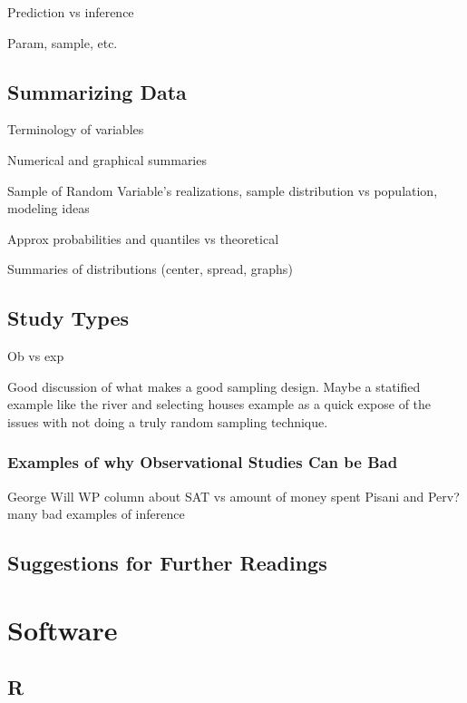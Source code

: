 \documentclass[
]{book}
\theoremstyle{definition}
\theoremstyle{definition}
\theoremstyle{definition}
\theoremstyle{remark}
\begin{document}
Prediction vs inference

Param, sample, etc.

\hypertarget{summarizing-data}{%
\subsection{Summarizing Data}\label{summarizing-data}}

Terminology of variables

Numerical and graphical summaries

Sample of Random Variable's realizations, sample distribution vs population, modeling ideas

Approx probabilities and quantiles vs theoretical

Summaries of distributions (center, spread, graphs)

\hypertarget{study-types}{%
\subsection{Study Types}\label{study-types}}

Ob vs exp

Good discussion of what makes a good sampling design. Maybe a statified example like the river and selecting houses example as a quick expose of the issues with not doing a truly random sampling technique.

\hypertarget{examples-of-why-observational-studies-can-be-bad}{%
\subsubsection{Examples of why Observational Studies Can be Bad}\label{examples-of-why-observational-studies-can-be-bad}}

George Will WP column about SAT vs amount of money spent
Pisani and Perv? many bad examples of inference

\hypertarget{suggestions-for-further-readings}{%
\subsection{Suggestions for Further Readings}\label{suggestions-for-further-readings}}

\hypertarget{software-1}{%
\section{Software}\label{software-1}}

\hypertarget{r-1}{%
\subsection{R}\label{r-1}}
\end{document}
